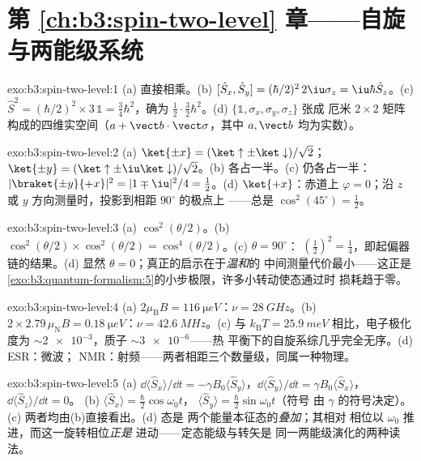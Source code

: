\section*{第 \ref{ch:b3:spin-two-level} 章——自旋与两能级系统}

\begin{solution}{exo:b3:spin-two-level:1}
(a) 直接相乘。(b) $[\hat S_x, \hat S_y] =
(\hbar/2)^2\,2\iu\sigma_z = \iu\hbar\hat S_z$。(c) $\hat S^2 =
(\hbar/2)^2 \times 3\,\mathbb 1 = \tfrac34\hbar^2$，确为
$\tfrac12\cdot\tfrac32\hbar^2$。(d) $\{\mathbb 1, \sigma_x,
\sigma_y, \sigma_z\}$ 张成
厄米 $2\times2$ 矩阵构成的四维实空间（$a + \vect b\cdot\vect\sigma$，其中 $a,
\vect b$ 均为实数）。
\end{solution}

\begin{solution}{exo:b3:spin-two-level:2}
(a) $\ket{\pm x} = (\ket\uparrow \pm \ket\downarrow)/\sqrt2$；
$\ket{\pm y} = (\ket\uparrow \pm \iu\ket\downarrow)/\sqrt2$。(b)
各占一半。(c) 仍各占一半：$|\braket{\pm y}{+x}|^2 =
|1 \mp \iu|^2/4 = \tfrac12$。(d) $\ket{+x}$：赤道上 $\varphi =
0$；沿 $z$ 或 $y$ 方向测量时，投影到相距 $90^\circ$ 的极点上
——总是 $\cos^2(45^\circ) = \tfrac12$。
\end{solution}

\begin{solution}{exo:b3:spin-two-level:3}
(a) $\cos^2(\theta/2)$。(b) $\cos^2(\theta/2) \times
\cos^2(\theta/2) = \cos^4(\theta/2)$。(c) $\theta = 90^\circ$：
$(\tfrac12)^2 = \tfrac14$，即起偏器链的结果。(d)
显然 $\theta = 0$；真正的启示在于\emph{温和}的
中间测量代价最小——这正是
\cref{exo:b3:quantum-formalism:5}的小步极限，许多小转动使态通过时
损耗趋于零。
\end{solution}

\begin{solution}{exo:b3:spin-two-level:4}
(a) $2\mu_{\text{B}}B = \qty{116}{\micro eV}$：$\nu =
\qty{28}{GHz}$。(b) $2 \times 2.79\,\mu_{\text{N}}B =
\qty{0.18}{\micro eV}$：$\nu = \qty{42.6}{MHz}$。(c)
与 $k_{\text{B}}T = \qty{25.9}{meV}$ 相比，电子极化
度为 $\sim\num{2e-3}$，质子 $\sim\num{3e-6}$——热
平衡下的自旋系综几乎完全无序。(d) ESR：微波；
NMR：射频——两者相距三个数量级，同属一种物理。
\end{solution}

\begin{solution}{exo:b3:spin-two-level:5}
(a) $\dd\langle\hat S_x\rangle/\dd t = -\gamma B_0\langle\hat
S_y\rangle$，$\dd\langle\hat S_y\rangle/\dd t = \gamma
B_0\langle\hat S_x\rangle$，$\dd\langle\hat S_z\rangle/\dd t = 0$。
(b) $\langle\hat S_x\rangle = \tfrac\hbar2\cos\omega_0t$，
$\langle\hat S_y\rangle = \tfrac\hbar2\sin\omega_0t$（符号
由 $\gamma$ 的符号决定）。(c) 两者均由(b)直接看出。(d) 态是
两个能量本征态的\emph{叠加}；其相对
相位以 $\omega_0$ 推进，而这一旋转相位\emph{正是}
进动——定态能级与转矢是
同一两能级演化的两种读法。
\end{solution}

